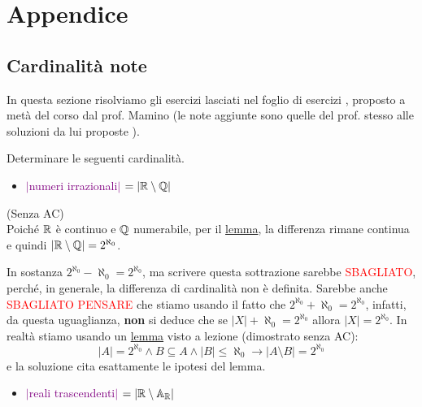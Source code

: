 \section{Appendice}
\subsection{Cardinalità note}
In questa sezione risolviamo gli esercizi lasciati nel foglio di esercizi \cite{mamino_eti_22_23_esercizi}, proposto a metà del corso dal prof. Mamino (le note aggiunte sono quelle del prof. stesso alle soluzioni da lui proposte \cite{mamino_eti_22_23_sol_esercizi}).

\begin{exercise}
	Determinare le seguenti cardinalità.
\end{exercise}

\begin{itemize}
	\item \textcolor{purple}{$|$numeri irrazionali$|$ $= |\mathbb R \setminus \mathbb Q|$}
\end{itemize}

\begin{soln}
	(Senza AC)\\
	Poiché $\mathbb R$ è continuo e $\mathbb Q$ numerabile, per il \hyperref[continuo-numerabile]{lemma}, la differenza rimane continua e quindi $|\mathbb R \setminus \mathbb Q| = 2^{\aleph_0}$.
\end{soln}

\begin{note}
	In sostanza $2^{\aleph_0} - \aleph_0 = 2^{\aleph_0}$, ma scrivere questa sottrazione sarebbe \textcolor{red}{SBAGLIATO}, perché, in generale, la differenza di cardinalità non è definita. Sarebbe anche \textcolor{red}{SBAGLIATO PENSARE}
	che stiamo usando il fatto che $2^{\aleph_0} + \aleph_0 = 2^{\aleph_0}$, infatti, da questa uguaglianza, \textbf{non} si deduce che se $|X| + \aleph_0 = 2^{\aleph_0}$ allora $|X| = 2^{\aleph_0}$.
	In realtà stiamo usando un \hyperref[continuo-numerabile]{lemma} visto a lezione (dimostrato senza AC):
	\[ |A| = 2^{\aleph_0} \land B \subseteq A \land |B| \leq \aleph_0 \rightarrow |A \setminus B| = 2^{\aleph_0}
 		\]
	e la soluzione cita esattamente le ipotesi del lemma.
\end{note}

\begin{itemize}
	\item \textcolor{purple}{$|$reali trascendenti$|$ $= |\mathbb R \setminus \mathbb{A}_{\mathbb R}|$}
\end{itemize}

